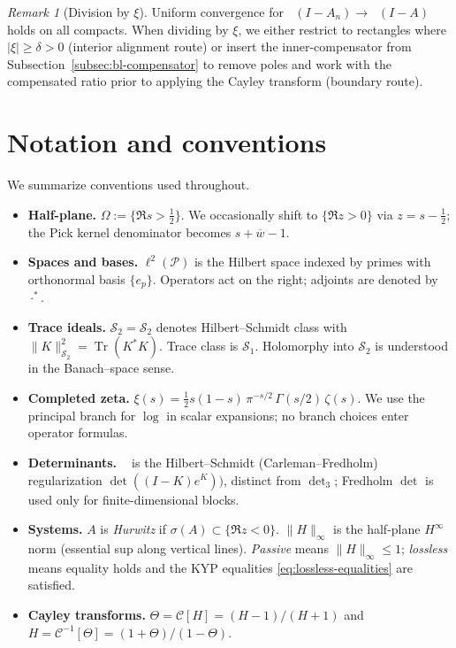 \documentclass[11pt]{article}
\theoremstyle{definition}
\theoremstyle{remark}
\newtheorem{remark}[theorem]{Remark}
\newcommand{\PP}{\mathcal{P}}
\newcommand{\HS}{\mathcal{S}_2}
\DeclareMathOperator{\Tr}{Tr}
\DeclareMathOperator{\dettwo}{det_2}
\begin{document}
\begin{remark}[Division by \(\xi\)]
Uniform convergence for \(\dettwo(I-A_n)\to\dettwo(I-A)\) holds on all compacts. When dividing by \(\xi\), we either restrict to rectangles where \(|\xi|\ge \delta>0\) (interior alignment route) or insert the inner-compensator from Subsection~\ref{subsec:bl-compensator} to remove poles and work with the compensated ratio prior to applying the Cayley transform (boundary route).
\end{remark}

\section{Notation and conventions}\label{sec:notation}
We summarize conventions used throughout.
\begin{itemize}
 \item \textbf{Half-plane.} \(\Omega:=\{\Re s>\tfrac12\}\). We occasionally shift to \(\{\Re z>0\}\) via \(z=s-\tfrac12\); the Pick kernel denominator becomes \(s+\overline{w}-1\).
 \item \textbf{Spaces and bases.} \(\ell^2(\PP)\) is the Hilbert space indexed by primes with orthonormal basis \(\{e_p\}\). Operators act on the right; adjoints are denoted by \(\cdot^*\).
 \item \textbf{Trace ideals.} \(\HS=\mathcal S_2\) denotes Hilbert--Schmidt class with \(\|K\|_{\HS}^2=\Tr(K^*K)\). Trace class is \(\mathcal S_1\). Holomorphy into \(\HS\) is understood in the Banach--space sense.
 \item \textbf{Completed zeta.} \(\xi(s)=\tfrac12 s(1-s)\,\pi^{-s/2}\,\Gamma(s/2)\,\zeta(s)\). We use the principal branch for \(\log\) in scalar expansions; no branch choices enter operator formulas.
\item \textbf{Determinants.} \(\dettwo\) is the Hilbert--Schmidt (Carleman--Fredholm) regularization \(\det((I-K)e^{K}))\), distinct from \(\det_3\); Fredholm \(\det\) is used only for finite-dimensional blocks.
 \item \textbf{Systems.} \(A\) is \emph{Hurwitz} if \(\sigma(A)\subset\{\Re z<0\}\). \(\|H\|_\infty\) is the half-plane \(H^\infty\) norm (essential sup along vertical lines). \emph{Passive} means \(\|H\|_\infty\le 1\); \emph{lossless} means equality holds and the KYP equalities \eqref{eq:lossless-equalities} are satisfied.
 \item \textbf{Cayley transforms.} \(\Theta=\mathcal C[H]=(H-1)/(H+1)\) and \(H=\mathcal C^{-1}[\Theta]=(1+\Theta)/(1-\Theta)\).
\end{itemize}
\end{document}

